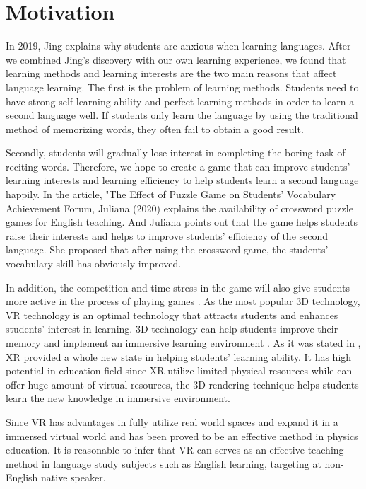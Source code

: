 \documentclass{vgtc}                          %
\begin{document}
\section{Motivation}
In 2019, Jing\cite{jing2019effectiveness} explains why students are anxious when learning languages. After we combined Jing’s discovery with our own learning experience, we found that learning methods and learning interests are the two main reasons that affect language learning. The first is the
problem of learning methods. Students need to have strong self-learning ability and perfect learning methods in order to learn a second language well. If students only learn the language by using the traditional method of memorizing words, they often fail to obtain a good result. 

Secondly, students will gradually lose interest in completing the boring task of reciting words. Therefore, we hope to create a game that can improve students' learning interests and learning efficiency to help students learn a second language happily. In the article, "The Effect of Puzzle Game on Students' Vocabulary Achievement Forum, Juliana (2020) explains the availability of crossword puzzle games for English teaching\cite{sitompul2020effect}. And Juliana points out that the game helps students raise their interests and helps to improve students' efficiency of the second language. She proposed that after using the crossword game, the students' vocabulary skill has obviously improved. 

In addition, the competition and time stress in the game will also give students more active in the process of playing games \cite{chang2003development}\cite{lin2007implementation}\cite{inkpen1995playing}. As the most popular 3D technology, VR technology is an optimal technology that attracts students and enhances students' interest in learning. 3D technology can help students improve their memory and implement an immersive learning environment \cite{billinghurst20122012}. As it was stated in \cite{yavoruk2019teaching}, XR provided a whole new state in 
helping students' learning ability. It has high potential in education field since XR utilize limited physical resources while can offer huge amount of virtual resources, the 3D rendering technique helps students learn the new knowledge in immersive environment. 

Since VR has advantages in fully utilize real world spaces and expand it in a immersed virtual world and has been proved to be an effective method in physics education. It is reasonable to infer that VR can serves as an effective teaching method in language study subjects such as English learning, targeting at
non-English native speaker.
\end{document}
